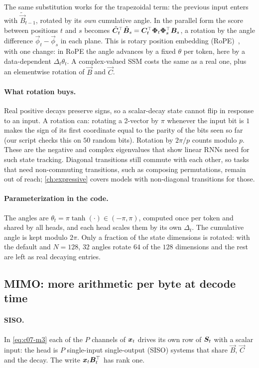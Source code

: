 The same substitution works for the trapezoidal term: the previous input enters with
$\tilde{\vec B}_{t-1}$, rotated by its \emph{own} cumulative angle. In the parallel form the
score between positions $t$ and $s$ becomes
$\tilde{\bm{C}}_t^{\top}\tilde{\bm{B}}_s = \bm{C}_t^{\top}\bm\Phi_t\bm\Phi_s^{\top}\bm{B}_s$, a rotation by the
angle difference $\vec\phi_t - \vec\phi_s$ in each plane. This is rotary position embedding
(RoPE)~\citep{c01-su2024roformer}, with one change: in RoPE the angle advances by a fixed
$\theta$ per token, here by a data-dependent $\Delta_t\theta_t$. A complex-valued SSM costs
the same as a real one, plus an elementwise rotation of $\vec B$ and $\vec C$.

\paragraph{What rotation buys.} Real positive decays preserve signs, so a scalar-decay state
cannot flip in response to an input. A rotation can: rotating a 2-vector by $\pi$ whenever the
input bit is $1$ makes the sign of its first coordinate equal to the parity of the bits seen
so far (our script checks this on $50$ random bits). Rotation by $2\pi/p$ counts modulo $p$.
These are the negative and complex eigenvalues that \citet{c03-grazzi2025unlocking} show
linear RNNs need for such state tracking. Diagonal transitions still commute with each
other, so tasks that need non-commuting transitions, such as composing permutations,
remain out of reach; \cref{ch:expressive} covers models with non-diagonal transitions for those.

\paragraph{Parameterization in the code.} The angles are $\theta_t = \pi\tanh(\cdot)\in(-\pi,\pi)$,
computed once per token and shared by all heads, and each head scales them by its own
$\Delta_t$. The cumulative angle is kept modulo $2\pi$. Only a fraction of the state
dimensions is rotated: with the default  and $N = 128$, $32$ angles rotate
$64$ of the $128$ dimensions and the rest are left as real decaying entries.

\subsection{MIMO: more arithmetic per byte at decode time}\label{sec:c07-mimo}

\paragraph{SISO.} In \cref{eq:c07-m3} each of the $P$ channels of $\bm{x}_t$ drives its own row of
$\bm{S}_t$ with a scalar input: the head is $P$ single-input single-output (SISO) systems that
share $\vec B$, $\vec C$ and the decay. The write $\bm{x}_t\bm{B}_t^{\top}$ has rank one.

